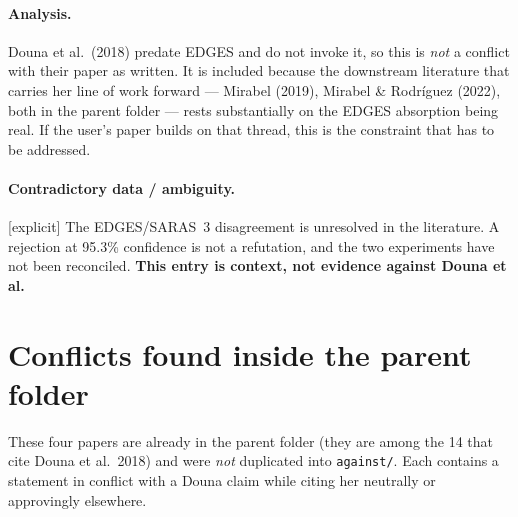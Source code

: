 \documentclass[11pt,a4paper]{article}
\newcommand{\flag}[1]{\textcolor{orange!75!black}{\textsf{\small [#1]}}}
\begin{document}
\paragraph{Analysis.}
Douna et al.\ (2018) predate EDGES and do not invoke it, so this is
\emph{not} a conflict with their paper as written. It is included because the
downstream literature that carries her line of work forward --- Mirabel (2019),
Mirabel \& Rodr\'iguez (2022), both in the parent folder --- rests substantially
on the EDGES absorption being real. If the user's paper builds on that thread,
this is the constraint that has to be addressed.

\paragraph{Contradictory data / ambiguity.} \flag{explicit}
The EDGES/SARAS~3 disagreement is unresolved in the literature. A rejection at
95.3\% confidence is not a refutation, and the two experiments have not been
reconciled. \textbf{This entry is context, not evidence against Douna et al.}

\section{Conflicts found inside the parent folder}
\label{sec:infolder}

These four papers are already in the parent folder (they are among the 14 that
cite Douna et al.\ 2018) and were \emph{not} duplicated into \texttt{against/}.
Each contains a statement in conflict with a Douna claim while citing her
neutrally or approvingly elsewhere.
\end{document}
